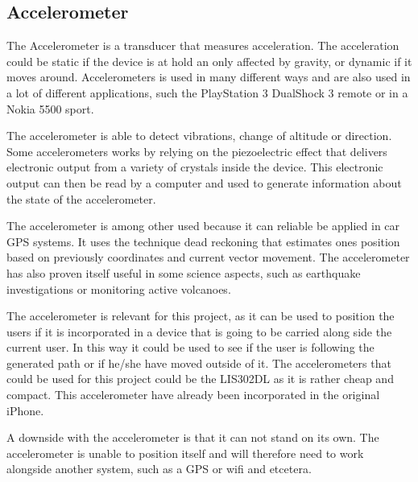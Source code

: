 \subsection{Accelerometer}

The Accelerometer is a transducer that measures acceleration. The acceleration could be static if the device is at hold an only affected by gravity, or dynamic if it moves around\cite{acc_engi}. Accelerometers is used in many different ways and are also used in a lot of different applications, such the PlayStation 3 DualShock 3 remote\cite{acc_ps3} or in a Nokia 5500 sport\cite{acc_nokia}.


The accelerometer is able to detect vibrations, change of altitude or direction\cite{acc_engi}. Some accelerometers works by relying on the piezoelectric effect that delivers electronic output from a variety of crystals inside the device\cite{acc_piezo}. This electronic output can then be read by a computer and used to generate information about the state of the accelerometer.


The accelerometer is among other used because it can reliable be applied in car GPS systems. It uses the technique dead reckoning that estimates ones position based on previously coordinates and current vector movement\cite{acc_dead}. The accelerometer has also proven itself useful in some science aspects, such as earthquake investigations or monitoring active volcanoes\cite{acc_vulkan}. 


The accelerometer is relevant for this project, as it can be used to position the users if it is incorporated in a device that is going to be carried along side the current user. In this way it could be used to see if the user is following the generated path or if he/she have moved outside of it. The accelerometers that could be used for this project could be the LIS302DL as it is rather cheap and compact\cite{acc_price,acc_lis302dl}. This accelerometer have already been incorporated in the original iPhone\cite{acc_iPhone}.


A downside with the accelerometer is that it can not stand on its own. The accelerometer is unable to position itself and will therefore need to work alongside another system, such as a GPS or wifi and etcetera. 